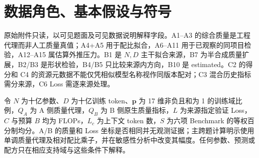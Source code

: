 \section{数据角色、基本假设与符号}
原始附件只读，以可见题面及可见数据说明解释字段。A1--A3 的综合质量是工程代理而非人工质量真值；A4+A5 用于配比拟合，A6--A11 用于已观察的同项目检验，A12--A15 属估算外推压力。B1 是 $N,D$ 主干拟合来源，B7 为半合成质量扩展，B2/B3 是形状检验，B4/B5 只比较来源内方向，B10 是 estimated。C2 的得分和 C4 的资源元数据不能仅凭相似模型名称视作同版本配对；C3 混合历史指标需分来源，C6 Loss 需逐来源处理。

令 $N$ 为十亿参数、$D$ 为十亿训练 token、$\boldsymbol p$ 为 17 维非负且和为 1 的训练域比例，$Q_A$ 为 A 侧质量代理，$Q_B$ 为 B 侧原生质量指标，$L$ 为来源指定验证 Loss，$C$ 与预算 $B$ 均为 FLOPs，$L_c$ 为上下文 token 数，$S$ 为六项 Benchmark 的等权百分制均分。A/B 的质量和 Loss 坐标是否相同并无观测证据；主跨题计算明示使用单调质量代理及相对配比乘子，并在敏感性分析中改变其幅度。任何参数、预测或配方只在相应支持域与这些条件下解释。

